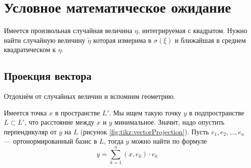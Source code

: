 \section{Условное математическое ожидание}
Имеется произвольная случайная величина $\eta$, интегрируемая с квадратом.
Нужно найти случайную величину $\tilde{\eta}$ которая
измерима в $\sigma\left( \xi \right)$
и ближайшая в среднем квадратическом к $\eta$.

\subsection{Проекция вектора}
Отдохнём от случайных величин и вспомним геометрию.

Имеется точка $x$ в пространстве $L'$.
Мы ищем такую точку $y$ в подпространстве $L\subset L'$,
что расстояние между $x$ и $y$ минимальное.
Значит, надо опустить перпендикуляр от $y$ на $L$
(рисунок \ref{fig:tikz:vectorProjection}).
Пусть $e_1, e_2, \dots, e_n$ --- ортонормированный базис в $L$,
тогда $y$ можно найти по формуле
\begin{equation}\label{vectorProjection}
  y = \sum_{k=1}^n \left( x, e_k \right) \cdot e_k
\end{equation}
\begin{comment}
Потому что $y \in L$ должен лежать в пространстве $L$ по условию,
а это значит, что он должен быть линейной комбинацией базисных векторов
$e_1, e_2, \dots, e_n$ и это очевидно выполняется

Также разностью $x-y$ должен быть вектор, перпендикулярный пространству $L$.
То есть скалярное произведение этой разности с любым вектором $z$
из пространства $L$ должно равняться нулю
$$\left( x-y \right) \perp L
  \Leftrightarrow \forall z \in L:
  \left( x-y,z \right)=0$$

Вследствие линейности скалярного произведения можно переписать это условие иначе
\begin{align*}
  \begin{cases}
      \forall z \in L: \left( x-y,z \right)=0\\
      \left( a+b,c \right)= \left( a,c \right)+ \left( b,c \right)
  \end{cases}
  \Rightarrow \forall z \in L: \left( x,z \right)= \left( y,z \right)
\end{align*}

Покажем, что и это выполняется.
$z$ является линейной комбинацией базисных векторов. Запишем это
$$z = \sum_{k=1}^n \beta_k \cdot e_k$$

В таком случае скалярное произведение $\left( x,z \right)$ будет таким
$$\left( x,z \right)= \sum_{k=1}^n \beta_k \cdot \left( x,e_k \right)$$

С произведением $\left( y,x \right)$ придётся чуть-чуть повозиться
$$\left( y,x \right)
  = \left( \sum_{k=1}^n\left( x,e_k \right)\cdot e_k,
      \sum_{k=1}^n \beta_k \cdot e_k \right)
  = \sum_{k=1}^n \left( x,e_k \right)\cdot \beta_k$$

Как видим, суммы равны, а значит, проекция $x$ на $L$ найдена верно.
\end{comment}
